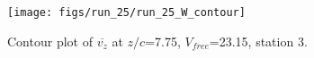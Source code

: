 \begin{figure}[H]
\centering
\texttt{[image: figs/run\_25/run\_25\_W\_contour]}
\caption{Contour plot of $\overline{v_{z}}$ at $z/c$=7.75, $V_{free}$=23.15, station 3.}
\label{fig:run_25_W_contour}
\end{figure}



